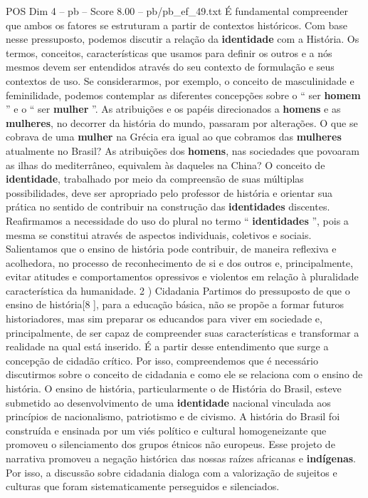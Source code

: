 \begin{textsample}{POS Dim 4 – pb – Score 8.00 – pb/pb\_ef\_49.txt}
É fundamental compreender que ambos os fatores se estruturam a partir de contextos históricos.
Com base nesse pressuposto, podemos discutir a relação da \textbf{identidade} com a História.
Os termos, conceitos, características que usamos para definir os outros e a nós mesmos devem ser entendidos através do seu contexto de formulação e seus contextos de uso.
Se considerarmos, por exemplo, o conceito de masculinidade e feminilidade, podemos contemplar as diferentes concepções sobre o “ ser \textbf{homem} ” e o “ ser \textbf{mulher} ”.
As atribuições e os papéis direcionados a \textbf{homens} e as \textbf{mulheres}, no decorrer da história do mundo, passaram por alterações.
O que se cobrava de uma \textbf{mulher} na Grécia era igual ao que cobramos das \textbf{mulheres} atualmente no Brasil?
As atribuições dos \textbf{homens}, nas sociedades que povoaram as ilhas do mediterrâneo, equivalem às daqueles na China?
O conceito de \textbf{identidade}, trabalhado por meio da compreensão de suas múltiplas possibilidades, deve ser apropriado pelo professor de história e orientar sua prática no sentido de contribuir na construção das \textbf{identidades} discentes.
Reafirmamos a necessidade do uso do plural no termo “ \textbf{identidades} ”, pois a mesma se constitui através de aspectos individuais, coletivos e sociais.
Salientamos que o ensino de história pode contribuir, de maneira reflexiva e acolhedora, no processo de reconhecimento de si e dos outros e, principalmente, evitar atitudes e comportamentos opressivos e violentos em relação à pluralidade característica da humanidade. 2 ) Cidadania Partimos do pressuposto de que o ensino de história[8 ], para a educação básica, não se propõe a formar futuros historiadores, mas sim preparar os educandos para viver em sociedade e, principalmente, de ser capaz de compreender suas características e transformar a realidade na qual está inserido.
É a partir desse entendimento que surge a concepção de cidadão crítico.
Por isso, compreendemos que é necessário discutirmos sobre o conceito de cidadania e como ele se relaciona com o ensino de história.
O ensino de história, particularmente o de História do Brasil, esteve submetido ao desenvolvimento de uma \textbf{identidade} nacional vinculada aos princípios de nacionalismo, patriotismo e de civismo.
A história do Brasil foi construída e ensinada por um viés político e cultural homogeneizante que promoveu o silenciamento dos grupos étnicos não europeus.
Esse projeto de narrativa promoveu a negação histórica das nossas raízes africanas e \textbf{indígenas}.
Por isso, a discussão sobre cidadania dialoga com a valorização de sujeitos e culturas que foram sistematicamente perseguidos e silenciados.

\end{textsample}
